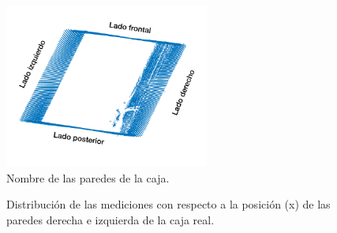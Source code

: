 \begin{figure}
  \centering \footnotesize
  \includegraphics[width=0.60\textwidth]{images/lados_caja.png}
  \captionsetup{font=footnotesize}
  \caption{Nombre de las paredes de la caja.}
  \label{fig:paredCaja}
\end{figure}

\begin{figure}[ht!]
     \begin{center}
    \end{center}
  \captionsetup{font=footnotesize}
    \caption{\label{}Distribución de las mediciones con respecto a la posición (x) de las 
    paredes derecha e izquierda de la caja real.}
\end{figure}

